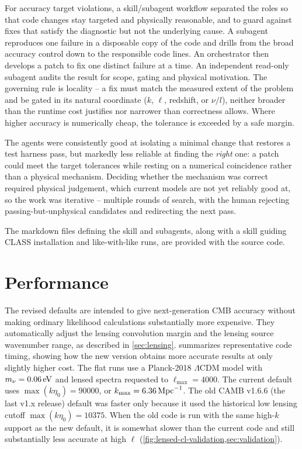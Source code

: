 \documentclass[prd, twocolumn, superscriptaddress, tightenlines, longbibliography, nofootinbib, eqsecnum, amsfonts, amsmath, floatfix, notitlepage]{revtex4-2}
\newcommand{\code}[1]{\texttt{\detokenize{#1}}}
\begin{document}
For accuracy target violations, a skill/subagent workflow separated the roles so
that code changes stay targeted and physically reasonable, and to guard against
fixes that satisfy the diagnostic but not the underlying cause. A subagent reproduces one failure in a disposable copy of the code and drills from the broad
accuracy control down to the responsible code lines. An orchestrator then develops a patch to fix one distinct failure at a time. An independent read-only subagent audits the result for scope, gating and physical motivation. The
governing rule is locality -- a fix must match the measured extent of the problem
and be gated in its natural coordinate (\(k\), \(\ell\), redshift, or \(\nu/l\)),
neither broader than the runtime cost justifies nor narrower than correctness
allows. Where higher accuracy is numerically cheap, the tolerance is exceeded by a safe margin.

The agents were consistently good at isolating a minimal change that restores
a test harness pass, but markedly less reliable at finding the \emph{right} one: a patch could
meet the target tolerances while resting on a numerical coincidence rather than a
physical mechanism. Deciding whether the mechanism was correct required physical
judgement, which current models are not yet reliably good at, so the work was iterative --
multiple rounds of search, with the human rejecting passing-but-unphysical
candidates and redirecting the next pass.

The markdown files defining the \code{isolate-accuracy-fix} skill and subagents,
along with a \code{classy-comparisons} skill guiding \textsc{CLASS} installation and like-with-like runs, are provided with the source code.

\section{Performance}
\label{sec:performance}

The revised defaults are intended to give next-generation CMB accuracy without
making ordinary likelihood calculations substantially more expensive.  They
automatically adjust the lensing convolution margin and the lensing source wavenumber
range, as described in \cref{sec:lensing}.  
summarizes representative code timing, showing how the new version obtains more accurate results at only slightly higher cost.
The flat runs use a Planck-2018 \(\Lambda\)CDM model with \(m_\nu=0.06\,{\rm eV}\) and
lensed spectra requested to \(\ell_{\max}=4000\).  The current default uses
\(\max(k\eta_0)=90000\), or \(k_{\max}=6.36\,{\rm Mpc}^{-1}\).  The old
\textsc{CAMB} v1.6.6 (the last v1.x release) default was faster only because it used the historical low
lensing cutoff \(\max(k\eta_0)=10375\).  When the old code is run with the same
high-\(k\) support as the new default, it is somewhat slower than the current
code and still substantially less accurate at high $\ell$
(\cref{fig:lensed-cl-validation,sec:validation}).
\end{document}
